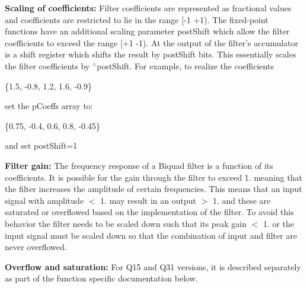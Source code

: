 \begin{DoxyParagraph}{}
{\bfseries Scaling of coefficients\-: } Filter coefficients are represented as fractional values and coefficients are restricted to lie in the range {\ttfamily \mbox{[}-\/1 +1)}. The fixed-\/point functions have an additional scaling parameter {\ttfamily post\-Shift} which allow the filter coefficients to exceed the range {\ttfamily \mbox{[}+1 -\/1)}. At the output of the filter's accumulator is a shift register which shifts the result by {\ttfamily post\-Shift} bits.  This essentially scales the filter coefficients by {$^\wedge$post\-Shift}. For example, to realize the coefficients 
\begin{DoxyPre}   
   \{1.5, -0.8, 1.2, 1.6, -0.9\}   
\end{DoxyPre}
 set the p\-Coeffs array to\-: 
\begin{DoxyPre}   
   \{0.75, -0.4, 0.6, 0.8, -0.45\}   
\end{DoxyPre}
 and set {\ttfamily post\-Shift=1}
\end{DoxyParagraph}
\begin{DoxyParagraph}{}
{\bfseries Filter gain\-: } The frequency response of a Biquad filter is a function of its coefficients. It is possible for the gain through the filter to exceed 1. meaning that the filter increases the amplitude of certain frequencies. This means that an input signal with amplitude $<$ 1. may result in an output $>$ 1. and these are saturated or overflowed based on the implementation of the filter. To avoid this behavior the filter needs to be scaled down such that its peak gain $<$ 1. or the input signal must be scaled down so that the combination of input and filter are never overflowed.
\end{DoxyParagraph}
\begin{DoxyParagraph}{}
{\bfseries Overflow and saturation\-: } For Q15 and Q31 versions, it is described separately as part of the function specific documentation below. 
\end{DoxyParagraph}


